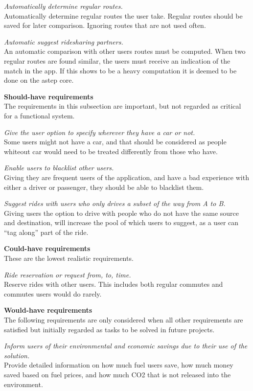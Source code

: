 \textit{Automatically determine regular routes.}\\
Automatically determine regular routes the user take. 
Regular routes should be saved for later comparison. 
Ignoring routes that are not used often.

\textit{Automatic suggest ridesharing partners.}\\
An automatic comparison with other users routes must be computed.
When two regular routes are found similar, the users must receive an indication of the match in the app.
If this shows to be a heavy computation it is deemed to be done on the \gls{astep} core.


\textbf{Should-have requirements}\\
The requirements in this subsection are important, but not regarded as critical for a functional system.

\textit{Give the user option to specify wherever they have a car or not.}\\
Some users might not have a car, and that should be considered as people whiteout car would need to be treated differently from those who have.

\textit{Enable users to blacklist other users.}\\
Giving they are frequent users of the application, and have a bad experience with either a driver or passenger, they should be able to blacklist them.

\textit{Suggest rides with users who only drives a subset of the way from A to B.}\\
Giving users the option to drive with people who do not have the same source and destination, will increase the pool of which users to suggest, as a user can ``tag along'' part of the ride.


\textbf{Could-have requirements}\\
These are the lowest realistic requirements. 

\textit{Ride reservation or request from, to, time.}\\
Reserve rides with other users. 
This includes both regular commutes and commutes users would do rarely.

\textbf{Would-have requirements}\\
The following requirements are only considered when all other requirements are satisfied but initially regarded as tasks to be solved in future projects.

\textit{Inform users of their environmental and economic savings due to their use of the solution.}\\
Provide detailed information on how much fuel users save, how much money saved based on fuel prices, and how much CO2 that is not released into the environment. 

